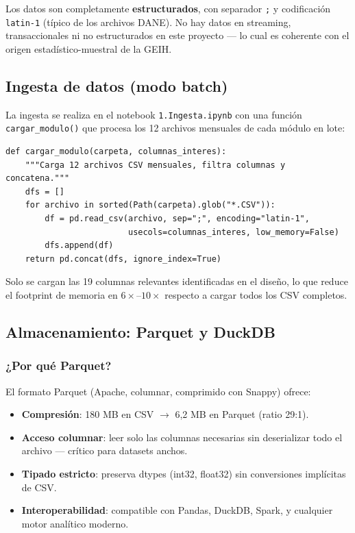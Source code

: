 \documentclass[12pt, a4paper]{article}
\begin{document}
Los datos son completamente \textbf{estructurados}, con separador \texttt{;} y
codificación \texttt{latin-1} (típico de los archivos DANE). No hay datos en streaming,
transaccionales ni no estructurados en este proyecto — lo cual es coherente con el origen
estadístico-muestral de la GEIH.

\subsection{Ingesta de datos (modo batch)}

La ingesta se realiza en el notebook \texttt{1.Ingesta.ipynb} con una función
\texttt{cargar\_modulo()} que procesa los 12 archivos mensuales de cada módulo en lote:

\begin{lstlisting}[caption={Función de ingesta batch — 1.Ingesta.ipynb}]
def cargar_modulo(carpeta, columnas_interes):
    """Carga 12 archivos CSV mensuales, filtra columnas y concatena."""
    dfs = []
    for archivo in sorted(Path(carpeta).glob("*.CSV")):
        df = pd.read_csv(archivo, sep=";", encoding="latin-1",
                         usecols=columnas_interes, low_memory=False)
        dfs.append(df)
    return pd.concat(dfs, ignore_index=True)
\end{lstlisting}

Solo se cargan las 19 columnas relevantes identificadas en el diseño, lo que reduce
el footprint de memoria en $6\times$--$10\times$ respecto a cargar todos los CSV completos.

\subsection{Almacenamiento: Parquet y DuckDB}

\subsubsection{¿Por qué Parquet?}

El formato Parquet (Apache, columnar, comprimido con Snappy) ofrece:
\begin{itemize}[noitemsep]
  \item \textbf{Compresión}: 180 MB en CSV $\to$ 6{,}2 MB en Parquet (ratio 29:1).
  \item \textbf{Acceso columnar}: leer solo las columnas necesarias sin deserializar
  todo el archivo — crítico para datasets anchos.
  \item \textbf{Tipado estricto}: preserva dtypes (int32, float32) sin conversiones
  implícitas de CSV.
  \item \textbf{Interoperabilidad}: compatible con Pandas, DuckDB, Spark, y cualquier
  motor analítico moderno.
\end{itemize}
\end{document}
